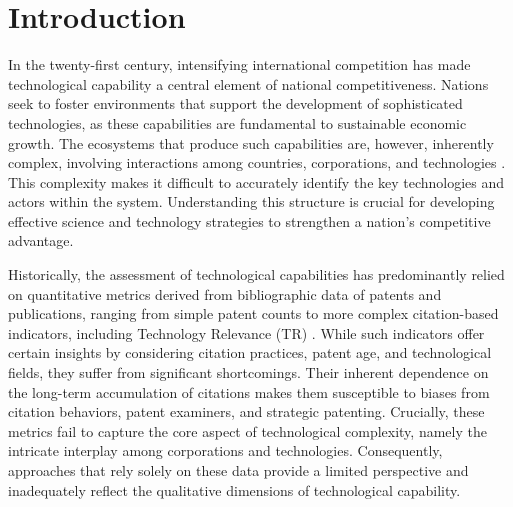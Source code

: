\section*{Introduction}
{}
\label{section:Introduction}

In the twenty-first century, intensifying international competition has made technological capability a central element of national competitiveness. 
Nations seek to foster environments that support the development of sophisticated technologies, as these capabilities are fundamental to sustainable economic growth. \cite{EC_SSP_nodate,Teixeira2022,NISTEP_nodate}
The ecosystems that produce such capabilities are, however, inherently complex, involving interactions among countries, corporations, and technologies \cite{Weaver1948science}. 
This complexity makes it difficult to accurately identify the key technologies and actors within the system. 
Understanding this structure is crucial for developing effective science and technology strategies to strengthen a nation's competitive advantage.

Historically, the assessment of technological capabilities has predominantly relied on quantitative metrics derived from bibliographic data of patents and publications, ranging from simple patent counts to more complex citation-based indicators, including Technology Relevance (TR) \cite{jaffe2019patent,aristodemou2018citations}. While such indicators offer certain insights by considering citation practices, patent age, and technological fields, they suffer from significant shortcomings. Their inherent dependence on the long-term accumulation of citations makes them susceptible to biases from citation behaviors, patent examiners, and strategic patenting. Crucially, these metrics fail to capture the core aspect of technological complexity, namely the intricate interplay among corporations and technologies. Consequently, approaches that rely solely on these data provide a limited perspective and inadequately reflect the qualitative dimensions of technological capability.

